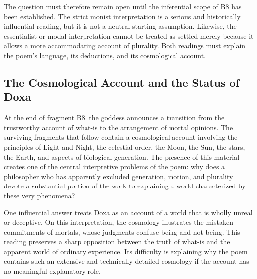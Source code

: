 
The question must therefore remain open
until the inferential scope of B8 has been
established. The strict monist interpretation
is a serious and historically influential
reading, but it is not a neutral starting
assumption. Likewise, the essentialist or
modal interpretation cannot be treated as
settled merely because it allows a more
accommodating account of plurality. Both
readings must explain the poem's language,
its deductions, and its cosmological account.


\subsection{The Cosmological Account and the Status of Doxa}


At the end of fragment B8, the goddess announces
a transition from the trustworthy account of
what-is to the arrangement of mortal opinions.
The surviving fragments that follow contain
a cosmological account involving the principles
of Light and Night, the celestial order, the
Moon, the Sun, the stars, the Earth, and aspects
of biological generation. The presence of this
material creates one of the central interpretive
problems of the poem: why does a philosopher
who has apparently excluded generation, motion,
and plurality devote a substantial portion
of the work to explaining a world characterized
by these very phenomena?


One influential answer treats Doxa as an
account of a world that is wholly unreal or
deceptive. On this interpretation, the
cosmology illustrates the mistaken commitments
of mortals, whose judgments confuse being
and not-being. This reading preserves a
sharp opposition between the truth of what-is
and the apparent world of ordinary experience.
Its difficulty is explaining why the poem
contains such an extensive and technically
detailed cosmology if the account has no
meaningful explanatory role.


